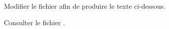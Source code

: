 \begin{exercice}
  \label{ex:base:commandes}
  Modifier le fichier  afin
  de produire le texte ci-dessous.
  \begin{center}
  \end{center}
  \begin{sol}
    Consulter le fichier .
  \end{sol}
\end{exercice}


